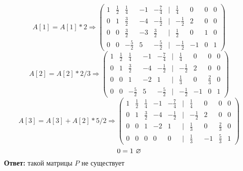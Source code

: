 \documentclass[a4paper]{article}
\newcommand{\mat}[1]{\begin{pmatrix} #1 \end{pmatrix}}
\newcommand{\ts}{\text{\space}}
\renewcommand{\r}{\Rightarrow}
\begin{document}
\begin{enumerate}
{        $$A[1] = A[1]*2 \r \mat{1 & \frac{1}{2} & \frac{1}{4} & -1 & -\frac{7}{4} & | & \frac{1}{4} & 0 & 0 & 0 \\ 0 & 1 & \frac{3}{2} & -4 & -\frac{1}{2} & | & -\frac{1}{2} & 2 & 0 & 0 \\ 0 & 0 & \frac{3}{2} & -3 & \frac{3}{2} & | & \frac{1}{2} & 0 & 1 & 0 \\ 0 & 0 & -\frac{5}{2} & 5 & -\frac{5}{2} & | & -\frac{1}{2} & -1 & 0 & 1}$$
        $$A[2] = A[2]*2/3 \r \mat{1 & \frac{1}{2} & \frac{1}{4} & -1 & -\frac{7}{4} & | & \frac{1}{4} & 0 & 0 & 0 \\ 0 & 1 & \frac{3}{2} & -4 & -\frac{1}{2} & | & -\frac{1}{2} & 2 & 0 & 0 \\ 0 & 0 & 1 & -2 & 1 & | & \frac{1}{3} & 0 & \frac{2}{3} & 0 \\ 0 & 0 & -\frac{5}{2} & 5 & -\frac{5}{2} & | & -\frac{1}{2} & -1 & 0 & 1}$$
        $$A[3] = A[3]+A[2]*5/2 \r \mat{1 & \frac{1}{2} & \frac{1}{4} & -1 & -\frac{7}{4} & | & \frac{1}{4} & 0 & 0 & 0 \\ 0 & 1 & \frac{3}{2} & -4 & -\frac{1}{2} & | & -\frac{1}{2} & 2 & 0 & 0 \\ 0 & 0 & 1 & -2 & 1 & | & \frac{1}{3} & 0 & \frac{2}{3} & 0 \\ 0 & 0 & 0 & 0 & 0 & | & \frac{1}{3} & -1 & \frac{5}{3} & 1}$$
        $$0 = 1 \ts \varnothing$$
    }
    \textbf{Ответ: } такой матрицы $P$ не существует \\\\


\end{enumerate}
\end{document}
